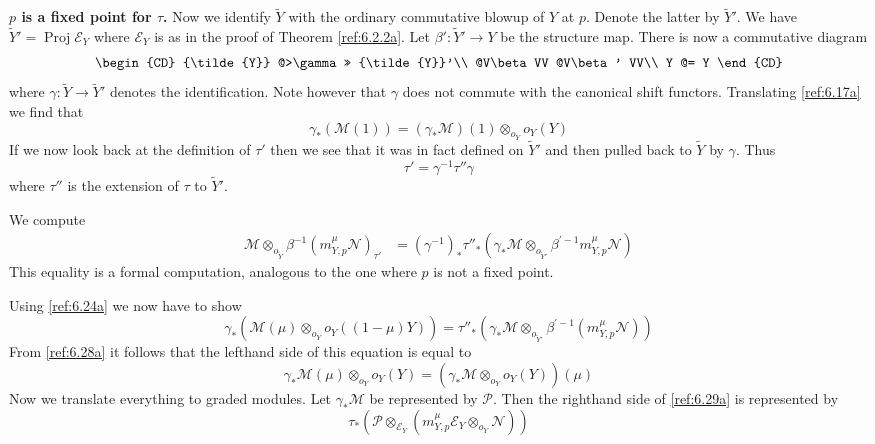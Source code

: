 \documentclass{amsproc}
\def\Escr{{\mathcal E}}
\def\Mscr{{\mathcal M}}
\def\Nscr{{\mathcal N}}
\def\Pscr{{\mathcal P}}
\def\Proj{\operatorname {Proj}}
\def\r{\rightarrow}
\theoremstyle{definition}
\theoremstyle{remark}
\numberwithin{equation}{section}
\numberwithin{table}{section}
\numberwithin{figure}{section}
\begin{document}
\noindent
{\bf $p$ is  a fixed point for $\tau$.} Now we identify ${\tilde{Y}}$ with the
ordinary commutative blowup of $Y$ at $p$. Denote the latter by
${\tilde{Y}}'$. We have ${\tilde{Y}}'=\Proj\Escr_Y$ where $\Escr_Y$ is as in the
proof of Theorem \ref{ref:6.2.2a}.
Let $\beta':{\tilde{Y}}'\r Y$ be the structure map. There is now a 
commutative diagram 
\[
\begin{CD}
{\tilde{Y}} @>\gamma>> {\tilde{Y}}'\\
@V\beta VV @V\beta' VV\\
Y @= Y
\end{CD}
\]
where $\gamma:{\tilde{Y}}\r {\tilde{Y}}'$ denotes the identification. Note however that
$\gamma$ does not commute with the canonical shift
functors. Translating \eqref{ref:6.17a} we find that
\begin{equation}
\label{ref:6.28a}
\gamma_\ast(\Mscr(1))=(\gamma_\ast\Mscr)(1)\otimes_{o_{Y}} o_Y(Y)
\end{equation}
If we now look back
at the definition of $\tau'$ then we see that it was in fact defined
on ${\tilde{Y}}'$ and then pulled back to ${\tilde{Y}}$ by $\gamma$. Thus 
\[
\tau'=\gamma^{-1}\tau''\gamma
\]
where $\tau''$ is the extension of $\tau$ to ${\tilde{Y}}'$.


We compute
\begin{align*}
\Mscr\otimes_{o_{\tilde{Y}}}\beta^{-1}(m^\mu_{Y,p}\Nscr)_{\tau'}
&=(\gamma^{-1})_\ast\tau''_\ast(\gamma_\ast\Mscr\otimes_{o_{{\tilde{Y}}'}}\beta^{'-1}
m^\mu_{Y,p}\Nscr)
\end{align*}
This equality is a formal computation, analogous to the one where
$p$ is not a fixed point.

Using \eqref{ref:6.24a} we now have to show
\begin{equation}
\label{ref:6.29a}
\gamma_\ast(\Mscr(\mu)\otimes_{o_Y} o_Y((1-\mu)Y))=
\tau''_\ast(\gamma_\ast\Mscr\otimes_{o_{{\tilde{Y}}'}}\beta^{'-1}
(m^\mu_{Y,p}\Nscr))
\end{equation}
From \eqref{ref:6.28a} it follows that the lefthand side of this equation is
equal to 
\begin{equation}
\label{ref:6.30a}
\gamma_\ast\Mscr(\mu)\otimes_{o_Y}o_Y(Y)=(\gamma_\ast\Mscr\otimes_{o_Y}
o_Y(Y)) (\mu)
\end{equation}
Now we translate everything to graded modules. Let $\gamma_\ast\Mscr$ be
represented by $\Pscr$. Then the righthand side of \eqref{ref:6.29a} is
represented by
\[
\tau_\ast(\Pscr\otimes_{\Escr_Y}(m^\mu_{Y,p}
\Escr_Y\otimes_{o_Y}\Nscr))
\]
\end{document}
